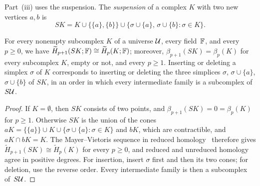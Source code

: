 Part~(iii) uses the suspension.
The \emph{suspension} of a complex $K$ with two new vertices $a,b$ is
\[
  SK=K\cup\{\{a\},\{b\}\}\cup\{\sigma\cup\{a\},\,\sigma\cup\{b\}:\sigma\in K\}.
\]

\begin{lemma}\label{lem:suspension}
For every nonempty subcomplex $K$ of a universe $\mathcal{U}$, every field~$\mathbb{F}$, and every $p\ge0$, we have $\widetilde H_{p+1}(SK;\mathbb{F})\cong\widetilde H_p(K;\mathbb{F})$; moreover, $\beta_{p+1}(SK)=\beta_p(K)$ for every subcomplex $K$, empty or not, and every $p\ge1$.
Inserting or deleting a simplex $\sigma$ of $K$ corresponds to inserting or deleting the three simplices $\sigma$, $\sigma\cup\{a\}$, $\sigma\cup\{b\}$ of $SK$, in an order in which every intermediate family is a subcomplex of~$S\mathcal{U}$.
\end{lemma}

\begin{proof}
If $K=\emptyset$, then $SK$ consists of two points, and $\beta_{p+1}(SK)=0=\beta_p(K)$ for $p\ge1$.
Otherwise $SK$ is the union of the cones $aK=\{\{a\}\}\cup K\cup\{\sigma\cup\{a\}:\sigma\in K\}$ and $bK$, which are contractible, and $aK\cap bK=K$.
The Mayer--Vietoris sequence in reduced homology~\cite[Section~2.2]{Hat02} therefore gives $\widetilde H_{p+1}(SK)\cong\widetilde H_p(K)$ for every $p\ge0$, and reduced and unreduced homology agree in positive degrees.
For insertion, insert $\sigma$ first and then its two cones; for deletion, use the reverse order. Every intermediate family is then a subcomplex of~$S\mathcal{U}$.
\end{proof}

